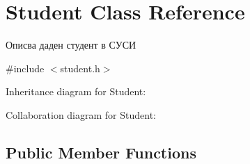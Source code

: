 \hypertarget{class_student}{}\section{Student Class Reference}
\label{class_student}


Описва даден студент в СУСИ  




{\ttfamily \#include $<$student.\+h$>$}



Inheritance diagram for Student\+:


Collaboration diagram for Student\+:
\subsection*{Public Member Functions}
